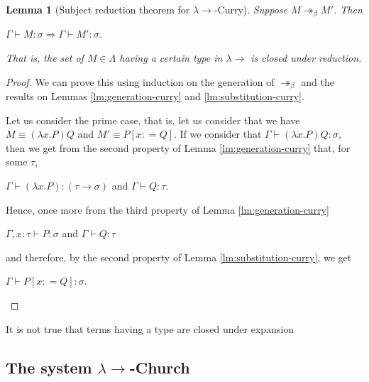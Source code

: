 \documentclass{llncs}
\newcommand{\lambdasystem}[0]{{\lambda}{\rightarrow}}
\theoremstyle{definition}
\numberwithin{mydef}{subsection}
\theoremstyle{plain}
\newtheorem{mylm}[mydef]{Lemma}
\theoremstyle{remark}
\begin{document}
	\begin{mylm}[Subject reduction theorem for $\lambdasystem$-Curry]\label{lm:subject-reduction-curry}
		Suppose $M \twoheadrightarrow _{\beta} M '$. Then
		\begin{center}
			$\Gamma \vdash M : \sigma \Rightarrow \Gamma \vdash M ' : \sigma$.
		\end{center}
		
		That is, the set of $M \in \Lambda$ having a certain type in $\lambdasystem$ is closed under reduction.
	\end{mylm}
	\begin{proof}
		We can prove this using induction on the generation of $\twoheadrightarrow _{\beta}$ and the results on Lemmas \ref{lm:generation-curry} and \ref{lm:substitution-curry}.
		
		Let us consider the prime case, that is, let us consider that we have $M \equiv \left( \lambda x . P \right) Q$ and $M ' \equiv P {\left[ x : = Q \right]}$.
		If we consider that $\Gamma \vdash \left( \lambda x . P \right) Q : \sigma$, then we get from the second property of Lemma \ref{lm:generation-curry} that, for some $\tau$,
		\begin{center}
			$\Gamma \vdash \left( \lambda x . P \right) : \left( \tau \rightarrow \sigma \right)$ and $\Gamma \vdash Q : \tau$.
		\end{center}
		Hence, once more from the third property of Lemma \ref{lm:generation-curry}
		\begin{center}
			$\Gamma, x : \tau \vdash P : \sigma$ and $\Gamma \vdash Q : \tau$
		\end{center}
		and therefore, by the second property of Lemma \ref{lm:substitution-curry}, we get
		\begin{center}
			$\Gamma \vdash P {\left[ x : = Q \right]} : \sigma$.
		\end{center}
	\end{proof}
	
	It is not true that terms having a type are closed under expansion
	
	\subsection{The system $\lambdasystem$-Church}
	
\end{document}
